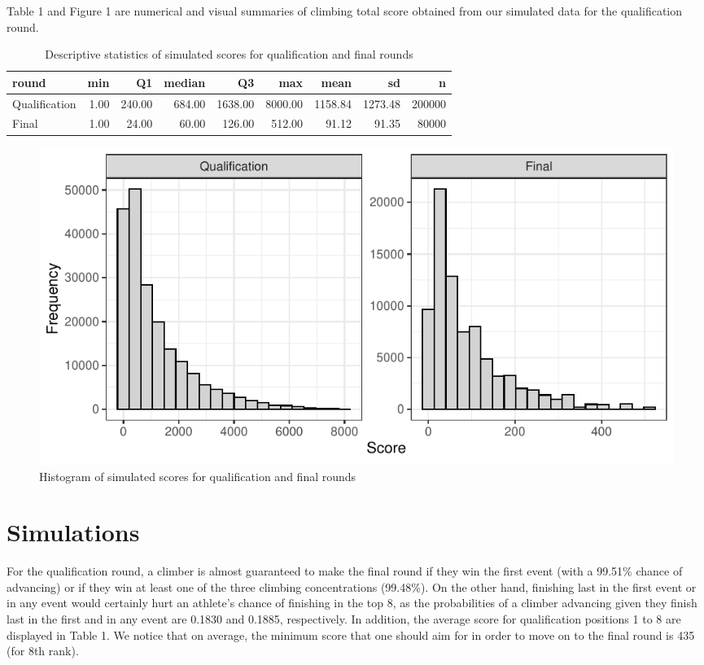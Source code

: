 \documentclass[12pt]{article}
\begin{document}
Table 1 and Figure 1 are numerical and visual summaries of climbing
total score obtained from our simulated data for the qualification
round.

\begin{table}[ht]
\centering
\caption{Descriptive statistics of simulated scores for qualification and final rounds} 
\begin{tabular}{lrrrrrrrr}
  \hline
round & min & Q1 & median & Q3 & max & mean & sd & n \\ 
  \hline
Qualification & 1.00 & 240.00 & 684.00 & 1638.00 & 8000.00 & 1158.84 & 1273.48 & 200000 \\ 
  Final & 1.00 & 24.00 & 60.00 & 126.00 & 512.00 & 91.12 & 91.35 & 80000 \\ 
   \hline
\end{tabular}
\end{table}

\begin{figure}[H]
\centering
\includegraphics{draft_files/figure-latex/unnamed-chunk-5-1.pdf}
\caption{Histogram of simulated scores for qualification and final
rounds}
\end{figure}

\hypertarget{simulations}{%
\section{Simulations}\label{simulations}}

For the qualification round, a climber is almost guaranteed to make the
final round if they win the first event (with a 99.51\% chance of
advancing) or if they win at least one of the three climbing
concentrations (99.48\%). On the other hand, finishing last in the first
event or in any event would certainly hurt an athlete's chance of
finishing in the top 8, as the probabilities of a climber advancing
given they finish last in the first and in any event are 0.1830 and
0.1885, respectively. In addition, the average score for qualification
positions 1 to 8 are displayed in Table 1. We notice that on average,
the minimum score that one should aim for in order to move on to the
final round is 435 (for 8th rank).
\end{document}
